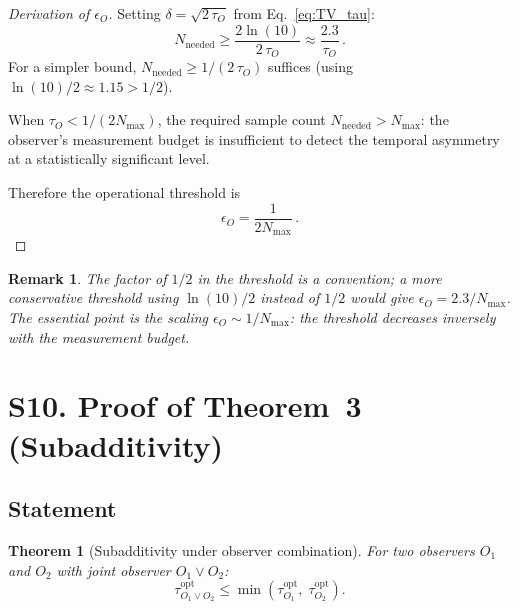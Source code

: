 \documentclass[aps,prd,preprint,superscriptaddress,longbibliography]{revtex4-2}
\newtheorem{theorem}{Theorem}
\newtheorem*{remark}{Remark}
\newcommand{\tauasym}{\tau}
\begin{document}
\begin{proof}[Derivation of $\epsilon_O$]
Setting $\delta = \sqrt{2\,\tauasym_O}$ from Eq.~\eqref{eq:TV_tau}:
\begin{equation}
  N_{\mathrm{needed}} \geq \frac{2\ln(10)}{2\,\tauasym_O}
  \approx \frac{2.3}{\tauasym_O}\,.
  \label{eq:N_tau}
\end{equation}
For a simpler bound, $N_{\mathrm{needed}} \geq 1/(2\,\tauasym_O)$
suffices (using $\ln(10)/2 \approx 1.15 > 1/2$).

When $\tauasym_O < 1/(2N_{\max})$, the required sample count
$N_{\mathrm{needed}} > N_{\max}$: the observer's measurement budget
is insufficient to detect the temporal asymmetry at a statistically
significant level.

Therefore the operational threshold is
\begin{equation}
  \boxed{\epsilon_O = \frac{1}{2N_{\max}}\,.}
  \label{eq:epsilon_O}
\end{equation}
\end{proof}

\begin{remark}
The factor of $1/2$ in the threshold is a convention;
a more conservative threshold using $\ln(10)/2$ instead of $1/2$
would give $\epsilon_O = 2.3/N_{\max}$.  The essential point is the
scaling $\epsilon_O \sim 1/N_{\max}$: the threshold decreases
inversely with the measurement budget.
\end{remark}

\section{S10. Proof of Theorem~3 (Subadditivity)}
\label{sec:subadditivity}

\subsection{Statement}

\begin{theorem}[Subadditivity under observer combination]
\label{thm:sub_full}
For two observers $O_1$ and $O_2$ with joint observer $O_1 \vee O_2$:
\begin{equation}
  \tauasym_{O_1 \vee O_2}^{\mathrm{opt}}
  \leq \min\!\left(\tauasym_{O_1}^{\mathrm{opt}},\;
  \tauasym_{O_2}^{\mathrm{opt}}\right).
  \label{eq:sub_full}
\end{equation}
\end{theorem}
\end{document}
